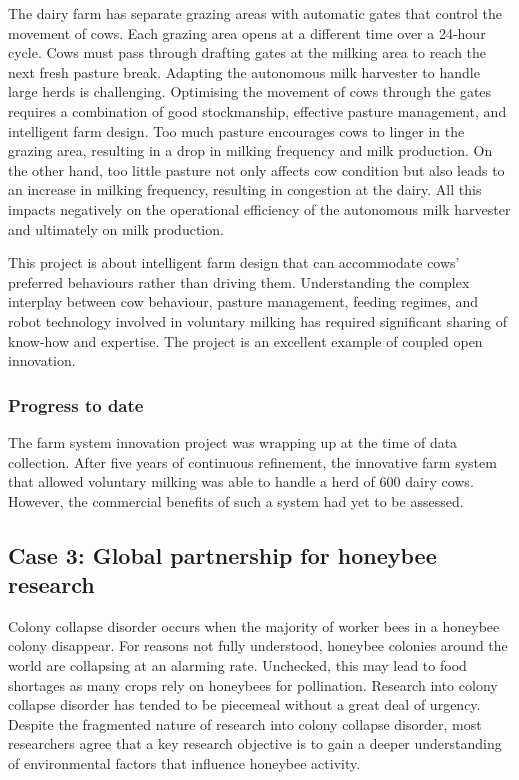 The dairy farm has separate grazing areas with automatic gates that control the movement of cows. Each grazing area opens at a different time over a 24-hour cycle. Cows must pass through drafting gates at the milking area to reach the next fresh pasture break. Adapting the autonomous milk harvester to handle large herds is challenging. Optimising the movement of cows through the gates requires a combination of good stockmanship, effective pasture management, and intelligent farm design. Too much pasture encourages cows to linger in the grazing area, resulting in a drop in milking frequency and milk production. On the other hand, too little pasture not only affects cow condition but also leads to an increase in milking frequency, resulting in congestion at the dairy. All this impacts negatively on the operational efficiency of the autonomous milk harvester and ultimately on milk production. \medskip

This project is about intelligent farm design that can accommodate cows' preferred behaviours rather than driving them. Understanding the complex interplay between cow behaviour, pasture management, feeding regimes, and robot technology involved in voluntary milking has required significant sharing of know-how and expertise. The project is an excellent example of coupled open innovation.  

\subsubsection{Progress to date}

The farm system innovation project was wrapping up at the time of data collection. After five years of continuous refinement, the innovative farm system that allowed voluntary milking was able to handle a herd of 600 dairy cows. However, the commercial benefits of such a system had yet to be assessed. 

\subsection{Case 3: Global partnership for honeybee research}

Colony collapse disorder occurs when the majority of worker bees in a honeybee colony disappear. For reasons not fully understood, honeybee colonies around the world are collapsing at an alarming rate. Unchecked, this may lead to food shortages as many crops rely on honeybees for pollination. Research into colony collapse disorder has tended to be piecemeal without a great deal of urgency. Despite the fragmented nature of research into colony collapse disorder, most researchers agree that a key research objective is to gain a deeper understanding of environmental factors that influence honeybee activity. 

